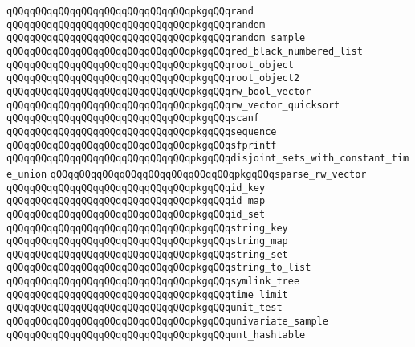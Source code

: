 \verb|qQQqqQQqqQQqqQQqqQQqqQQqqQQqqQQqpkgqQQqrand|\newline
\verb|qQQqqQQqqQQqqQQqqQQqqQQqqQQqqQQqpkgqQQqrandom|\newline
\verb|qQQqqQQqqQQqqQQqqQQqqQQqqQQqqQQqpkgqQQqrandom_sample|\newline
\verb|qQQqqQQqqQQqqQQqqQQqqQQqqQQqqQQqpkgqQQqred_black_numbered_list|\newline
\verb|qQQqqQQqqQQqqQQqqQQqqQQqqQQqqQQqpkgqQQqroot_object|\newline
\verb|qQQqqQQqqQQqqQQqqQQqqQQqqQQqqQQqpkgqQQqroot_object2|\newline
\verb|qQQqqQQqqQQqqQQqqQQqqQQqqQQqqQQqpkgqQQqrw_bool_vector|\newline
\verb|qQQqqQQqqQQqqQQqqQQqqQQqqQQqqQQqpkgqQQqrw_vector_quicksort|\newline
\verb|qQQqqQQqqQQqqQQqqQQqqQQqqQQqqQQqpkgqQQqscanf|\newline
\verb|qQQqqQQqqQQqqQQqqQQqqQQqqQQqqQQqpkgqQQqsequence|\newline
\verb|qQQqqQQqqQQqqQQqqQQqqQQqqQQqqQQqpkgqQQqsfprintf|\newline
\verb|qQQqqQQqqQQqqQQqqQQqqQQqqQQqqQQqpkgqQQqdisjoint_sets_with_constant_time_union|\newline
\verb|qQQqqQQqqQQqqQQqqQQqqQQqqQQqqQQqpkgqQQqsparse_rw_vector|\newline
\verb|qQQqqQQqqQQqqQQqqQQqqQQqqQQqqQQqpkgqQQqid_key|\newline
\verb|qQQqqQQqqQQqqQQqqQQqqQQqqQQqqQQqpkgqQQqid_map|\newline
\verb|qQQqqQQqqQQqqQQqqQQqqQQqqQQqqQQqpkgqQQqid_set|\newline
\verb|qQQqqQQqqQQqqQQqqQQqqQQqqQQqqQQqpkgqQQqstring_key|\newline
\verb|qQQqqQQqqQQqqQQqqQQqqQQqqQQqqQQqpkgqQQqstring_map|\newline
\verb|qQQqqQQqqQQqqQQqqQQqqQQqqQQqqQQqpkgqQQqstring_set|\newline
\verb|qQQqqQQqqQQqqQQqqQQqqQQqqQQqqQQqpkgqQQqstring_to_list|\newline
\verb|qQQqqQQqqQQqqQQqqQQqqQQqqQQqqQQqpkgqQQqsymlink_tree|\newline
\verb|qQQqqQQqqQQqqQQqqQQqqQQqqQQqqQQqpkgqQQqtime_limit|\newline
\verb|qQQqqQQqqQQqqQQqqQQqqQQqqQQqqQQqpkgqQQqunit_test|\newline
\verb|qQQqqQQqqQQqqQQqqQQqqQQqqQQqqQQqpkgqQQqunivariate_sample|\newline
\verb|qQQqqQQqqQQqqQQqqQQqqQQqqQQqqQQqpkgqQQqunt_hashtable|\newline
